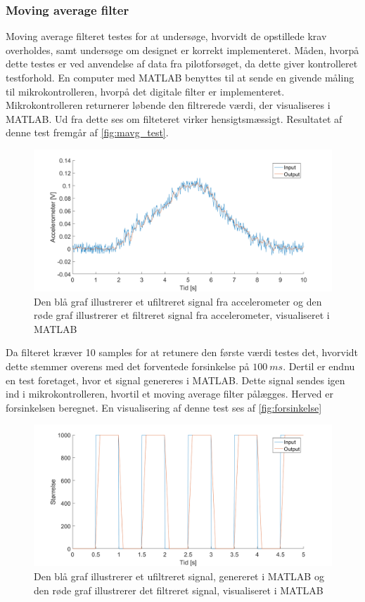 \subsubsection{Moving average filter} \label{sec:mavg_test}
Moving average filteret testes for at undersøge, hvorvidt de opstillede krav overholdes, samt undersøge om designet er korrekt implementeret. Måden, hvorpå dette testes er ved anvendelse af data fra pilotforsøget, da dette giver kontrolleret testforhold. 
En computer med MATLAB benyttes til at sende en givende måling til mikrokontrolleren, hvorpå det digitale filter er implementeret. Mikrokontrolleren returnerer løbende den filtrerede værdi, der visualiseres i MATLAB. Ud fra dette ses om filteteret virker hensigtsmæssigt. 
Resultatet af denne test fremgår af \autoref{fig:mavg_test}. 

\begin{figure}[H]
	\centering
	\includegraphics[width=1\textwidth]{figures/accelerometer_filter}
	\caption{Den blå graf illustrerer et ufiltreret signal fra accelerometer og den røde graf illustrerer et filtreret signal fra accelerometer, visualiseret i MATLAB}
	\label{fig:mavg_test}
\end{figure}

\noindent
Da filteret kræver 10 samples for at retunere den første værdi testes det, hvorvidt dette stemmer overens med det forventede forsinkelse på $100~ms$. Dertil er endnu en test foretaget, hvor et signal genereres i MATLAB. Dette signal sendes igen ind i mikrokontrolleren, hvortil et moving average filter pålægges. Herved er forsinkelsen beregnet. En visualisering af denne test ses af \autoref{fig:forsinkelse}

\begin{figure}[H]
	\centering
	\includegraphics[width=1\textwidth]{figures/forsinkelse}
	\caption{Den blå graf illustrerer et ufiltreret signal, genereret i MATLAB og den røde graf illustrerer det filtreret signal, visualiseret i MATLAB}
	\label{fig:forsinkelse}
\end{figure}

